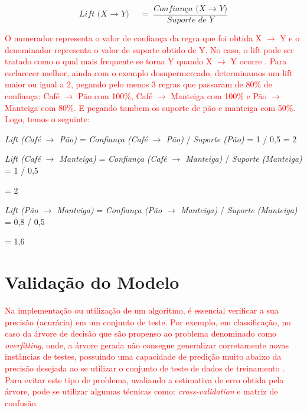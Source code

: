 \begin{equation}
    \label{eq:Lift}
        {\textit{Lift (X $\rightarrow$ Y)}\quad =\frac { \textit{Confiança (X $\rightarrow$ Y)} }{ \textit{Suporte de Y}} }
\end{equation}

\par
\textcolor{red}{O numerador representa o valor de confiança da regra que foi obtida X $\rightarrow$ Y e o denominador representa o valor de suporte obtido de Y. No caso, o lift pode ser tratado como o qual mais frequente se torna Y quando X $\rightarrow$ Y ocorre \cite{Gonsalves2004}. Para esclarecer melhor, ainda com o exemplo dosupermercado, determinamos um lift maior ou igual a 2, pegando pelo menos 3 regras que passaram de 80\% de confiança: Café $\rightarrow$ Pão com 100\%, Café $\rightarrow$ Manteiga com 100\% e Pão $\rightarrow$ Manteiga com 80\%. E pegando tambem os suporte de pão e manteiga com 50\%. Logo, temos o seguinte:}

\textit{Lift (Café $\rightarrow$ Pão)} = \textit{Confiança (Café $\rightarrow$ Pão)} /  \textit{Suporte (Pão)} = 1 / 0,5 = 2
    
\textit{Lift (Café $\rightarrow$ Manteiga)} = \textit{Confiança (Café $\rightarrow$ Manteiga)} /  \textit{Suporte (Manteiga)} = 1 / 0,5 

= 2
    
\textit{Lift (Pão $\rightarrow$ Manteiga)} = \textit{Confiança (Pão $\rightarrow$ Manteiga)} /  \textit{Suporte (Manteiga)} = 0,8 / 0,5 

= 1,6


\par
\textcolor{red}{}


\section{Validação do Modelo}

\par
\textcolor{red}{Na implementação ou utilização de um algoritmo, é essencial verificar a sua precisão (acurácia) em um conjunto de teste. Por exemplo, em classificação, no caso da árvore de decisão que são propenso ao problema denominado como \textit{overfitting}, onde, a árvore gerada não consegue generalizar corretamente novas instâncias de testes, possuindo uma capacidade de predição muito abaixo da precisão desejada ao se utilizar o conjunto de teste de dados de treinamento \cite{Carvalho2014}. Para evitar este tipo de problema, avaliando a estimativa de erro obtida pela árvore, pode se utilizar algumas técnicas como: \textit{cross-validation} e matriz de confusão.}



